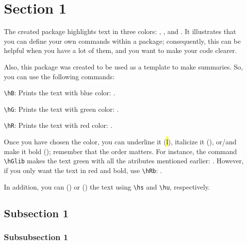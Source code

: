 
\section{Section 1}

  The created package highlights text in three colors: , , and .  It illustrates that you can define your own commands within a package; consequently, this can be helpful when you have a lot of them, and you want to make your code clearer.

  Also, this package was created to be used as a template to make summaries.  So, you can use the following commands:

  \begin{li}
    \item \verb=\hB=: Prints the text with blue  color: .
    \item \verb=\hG=: Prints the text with green color: .
    \item \verb=\hR=: Prints the text with red   color: .
  \end{li}

  Once you have chosen the color, you can underline it (\hl{l}), italicize it (), or/and make it bold (); remember that the order matters.  For instance, the command \verb=\hGlib= makes the text green with all the atributes mentioned earlier: .  However, if you only want the text in red and bold, use \verb=\hRb=: .

  In addition, you can () or () the text using \verb=\hs= and \verb=\hu=, respectively.

  \subsection{Subsection 1}

    \lipsum

    \subsubsection{Subsubsection 1}

      \lipsum
      \lipsum[1-2]
      \pagebreak
